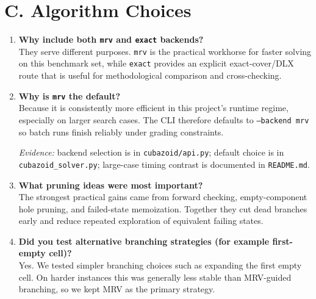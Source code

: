 \documentclass[11pt]{article}
\begin{document}
\section*{C. Algorithm Choices}
\begin{enumerate}[leftmargin=*,label=\textbf{Q\arabic*.},start=10]
\item \textbf{Why include both \texttt{mrv} and \texttt{exact} backends?}\\
They serve different purposes. \texttt{mrv} is the practical workhorse for faster solving on this benchmark set, while \texttt{exact} provides an explicit exact-cover/DLX route that is useful for methodological comparison and cross-checking.

\item \textbf{Why is \texttt{mrv} the default?}\\
Because it is consistently more efficient in this project's runtime regime, especially on larger search cases. The CLI therefore defaults to \texttt{--backend mrv} so batch runs finish reliably under grading constraints.

\textit{Evidence:} backend selection is in \texttt{cubazoid/api.py}; default choice is in \texttt{cubazoid\_solver.py}; large-case timing contrast is documented in \texttt{README.md}.

\item \textbf{What pruning ideas were most important?}\\
The strongest practical gains came from forward checking, empty-component hole pruning, and failed-state memoization. Together they cut dead branches early and reduce repeated exploration of equivalent failing states.

\item \textbf{Did you test alternative branching strategies (for example first-empty cell)?}\\
Yes. We tested simpler branching choices such as expanding the first empty cell. On harder instances this was generally less stable than MRV-guided branching, so we kept MRV as the primary strategy.
\end{enumerate}
\end{document}
